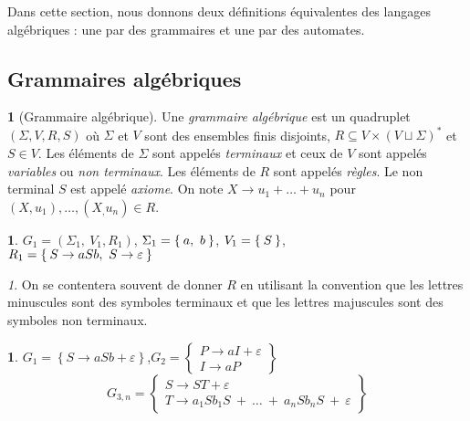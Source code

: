 \documentclass[11pt,a4paper]{article}
\theoremstyle{plain}
\theoremstyle{definition}
\newtheorem{defn}[thm]{\protect\definitionname}
\theoremstyle{definition}
\newtheorem{example}[thm]{\protect\examplename}
\theoremstyle{remark}
\theoremstyle{remark}
\newtheorem{rem}[thm]{\protect\remarkname}
\theoremstyle{plain}
\theoremstyle{plain}
\theoremstyle{plain}
\theoremstyle{remark}
\providecommand{\definitionname}{Définition}
\providecommand{\examplename}{Exemple}
\providecommand{\remarkname}{Remarque}
\begin{document}
Dans cette section, nous donnons deux définitions équivalentes des langages algébriques : une par des grammaires et une par des automates.

\subsection{Grammaires algébriques}


\begin{defn}[Grammaire algébrique]
	Une \emph{grammaire algébrique} est un quadruplet $(\Sigma, V, R, S)$ où $\Sigma$ et $V$ sont des ensembles finis disjoints, $R\subseteq V\times(V\sqcup\Sigma)^*$ et $S\in V$. Les éléments de $\Sigma$ sont appelés \emph{terminaux} et ceux de $V$ sont appelés \emph{variables} ou \emph{non terminaux}. Les éléments de $R$ sont appelés \emph{règles}. Le non terminal $S$ est appelé \emph{axiome}. On note $X\to u_1+\dots+u_n$ pour $(X,u_1),\dots,(X_,u_n)\in R$.
\end{defn}

\begin{example}
	$G_{1}=\left(\Sigma_{1},\ V_{1}, R_{1}\right)$, $\Sigma_{1}=\Set{a,\ b}$,
	$V_{1}=\Set S$,\\$R_{1}=\Set{S\to aSb,\ S\to\varepsilon}$
\end{example}

\begin{rem}
	On se contentera souvent de donner $R$ en utilisant la convention
	que les lettres minuscules sont des symboles terminaux et que les
	lettres majuscules sont des symboles non terminaux.
\end{rem}

\begin{example}
	$G_{1}=\left\{ S\to aSb+\varepsilon\right\} $,$G_{2}=\left\{ \begin{array}{c}
	P\to aI+\varepsilon\\
	I\to aP
	\end{array}\right\} $
	$$G_{3,n}=\left\{ \begin{array}{c}
	S\to ST+\varepsilon\\
	T\to a_{1}Sb_{1}S\ +\ \dots\ +\ a_{n}Sb_{n}S\ +\ \varepsilon
	\end{array}\right\} $$
\end{example}
\end{document}
